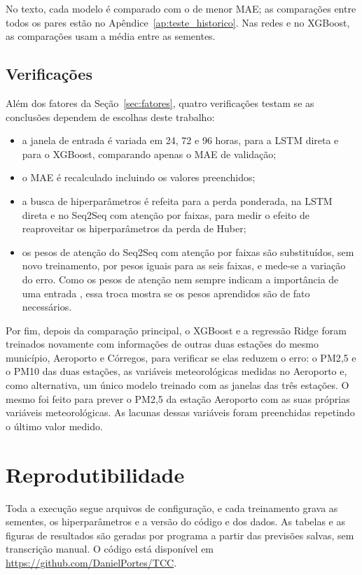 No texto, cada modelo é comparado com o de menor MAE; as comparações entre todos os pares estão no Apêndice~\ref{ap:teste_historico}. Nas redes e no XGBoost, as comparações usam a média entre as sementes.

\subsection{Verificações}
\label{sec:sensibilidades}

Além dos fatores da Seção~\ref{sec:fatores}, quatro verificações testam se as conclusões dependem de escolhas deste trabalho:

\begin{itemize}
    \item a janela de entrada é variada em 24, 72 e 96 horas, para a LSTM direta e para o XGBoost, comparando apenas o MAE de validação;
    \item o MAE é recalculado incluindo os valores preenchidos;
    \item a busca de hiperparâmetros é refeita para a perda ponderada, na LSTM direta e no Seq2Seq com atenção por faixas, para medir o efeito de reaproveitar os hiperparâmetros da perda de Huber;
    \item \label{sec:diagnostico_atencao}os pesos de atenção do Seq2Seq com atenção por faixas são substituídos, sem novo treinamento, por pesos iguais para as seis faixas, e mede-se a variação do erro. Como os pesos de atenção nem sempre indicam a importância de uma entrada \cite{jain2019attention,serrano2019attention,wiegreffe2019attention}, essa troca mostra se os pesos aprendidos são de fato necessários.
\end{itemize}

Por fim, depois da comparação principal, o XGBoost e a regressão Ridge foram treinados novamente com informações de outras duas estações do mesmo município, Aeroporto e Córregos, para verificar se elas reduzem o erro: o PM2,5 e o PM10 das duas estações, as variáveis meteorológicas medidas no Aeroporto e, como alternativa, um único modelo treinado com as janelas das três estações. O mesmo foi feito para prever o PM2,5 da estação Aeroporto com as suas próprias variáveis meteorológicas. As lacunas dessas variáveis foram preenchidas repetindo o último valor medido.

\section{Reprodutibilidade}
\label{sec:reprodutibilidade}

Toda a execução segue arquivos de configuração, e cada treinamento grava as sementes, os hiperparâmetros e a versão do código e dos dados. As tabelas e as figuras de resultados são geradas por programa a partir das previsões salvas, sem transcrição manual. O código está disponível em \url{https://github.com/DanielPortes/TCC}.
